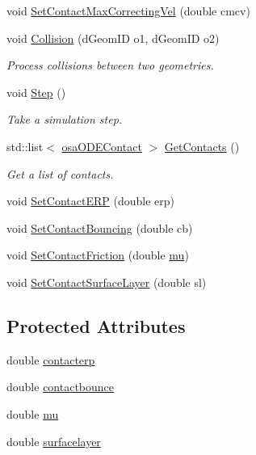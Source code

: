 \begin{DoxyCompactItemize}
\item 
void \hyperlink{classosa_o_d_e_world_a9fd2c069bfb1ad2f292311bc2dac78e5}{Set\-Contact\-Max\-Correcting\-Vel} (double cmcv)
\item 
void \hyperlink{classosa_o_d_e_world_ac259e47ae2b8f33f653e1ebfae73dce9}{Collision} (d\-Geom\-I\-D o1, d\-Geom\-I\-D o2)
\begin{DoxyCompactList}\small\item\em Process collisions between two geometries. \end{DoxyCompactList}\item 
void \hyperlink{classosa_o_d_e_world_ad355de908d3d45436dadf47c542c4182}{Step} ()
\begin{DoxyCompactList}\small\item\em Take a simulation step. \end{DoxyCompactList}\item 
std\-::list$<$ \hyperlink{structosa_o_d_e_contact}{osa\-O\-D\-E\-Contact} $>$ \hyperlink{classosa_o_d_e_world_a6e75ac4b7140e26bb381f1f5f388e998}{Get\-Contacts} ()
\begin{DoxyCompactList}\small\item\em Get a list of contacts. \end{DoxyCompactList}\item 
void \hyperlink{classosa_o_d_e_world_a43e84fc406edd956147c746de290ad5c}{Set\-Contact\-E\-R\-P} (double erp)
\item 
void \hyperlink{classosa_o_d_e_world_a107cf01ae0e9f24279673a406429b059}{Set\-Contact\-Bouncing} (double cb)
\item 
void \hyperlink{classosa_o_d_e_world_abacdd957195b8877c13ff75c627897d9}{Set\-Contact\-Friction} (double \hyperlink{classosa_o_d_e_world_ad480cb0282cb22313a485083b24dd242}{mu})
\item 
void \hyperlink{classosa_o_d_e_world_a45166aabfeeeed39909c7e44933d775b}{Set\-Contact\-Surface\-Layer} (double sl)
\end{DoxyCompactItemize}
\subsection*{Protected Attributes}
\begin{DoxyCompactItemize}
\item 
double \hyperlink{classosa_o_d_e_world_aade62058b4fd841e2d78cc9bdbf83b5d}{contacterp}
\item 
double \hyperlink{classosa_o_d_e_world_a32473325798a042ba65d0bcf43b11860}{contactbounce}
\item 
double \hyperlink{classosa_o_d_e_world_ad480cb0282cb22313a485083b24dd242}{mu}
\item 
double \hyperlink{classosa_o_d_e_world_a36fb96aa0db1cb3a9d38f7183be41389}{surfacelayer}
\end{DoxyCompactItemize}
